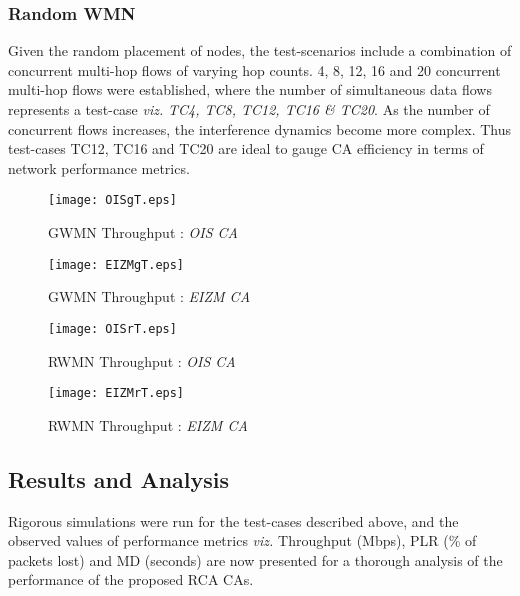 \documentclass[conference]{IEEEtran}
\begin{document}
\subsubsection {Random WMN}
Given the random placement of nodes, the test-scenarios include a combination of concurrent multi-hop flows of varying hop counts. 4, 8, 12, 16 and 20 concurrent multi-hop flows were established, where the number of simultaneous data flows represents a test-case \emph{viz.} \textit{TC4, TC8, TC12, TC16 \& TC20}. As the number of concurrent flows increases, the interference dynamics become more complex. Thus test-cases TC12, TC16 and TC20 are ideal to gauge CA efficiency in terms of network performance metrics.
\begin{figure}[htb!]
\texttt{[image: OISgT.eps]}
                \caption{GWMN Throughput  : \textit{OIS CA}}
                \label{OISGT}
                	 \vspace{.1cm}
        \end{figure}
\begin{figure}[htb!]
\texttt{[image: EIZMgT.eps]}
\caption{GWMN Throughput  : \textit{EIZM CA}}
\label{EIZMGT}
	  \vspace{.1cm}
\end{figure}
\begin{figure}[htb!]
\texttt{[image: OISrT.eps]}
                \caption{RWMN Throughput  : \textit{OIS CA}}
                \label{OISRT}
                	 \vspace{.1cm}
        \end{figure}
\begin{figure}[htb!]
\texttt{[image: EIZMrT.eps]}
	\caption{RWMN Throughput  : \textit{EIZM CA}}
	\label{EIZMRT}
		 \vspace{.1cm}
\end{figure}

\subsection{Results and Analysis}
Rigorous simulations were run for the test-cases described above, and the observed values of performance metrics \emph{viz.} Throughput (Mbps), PLR (\% of packets lost) and MD (seconds) are now presented for a thorough analysis of the performance of the proposed RCA CAs. 
\end{document}
